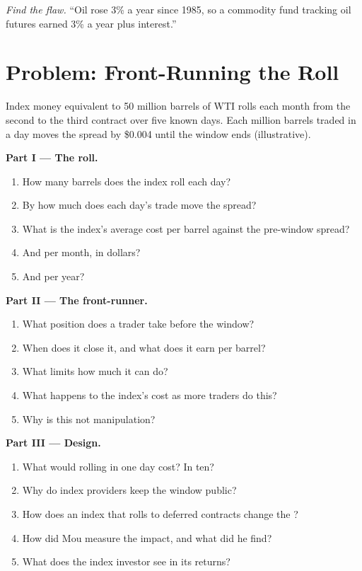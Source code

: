 \begin{exercise}[$\star\star\star$]\label{exo:m3:forward-curves-storage-and-convenience-yield:8}
\emph{Find the flaw.} ``Oil rose 3\% a year since 1985, so a commodity fund tracking oil futures earned
3\% a year plus interest.''
\end{exercise}

\section{Problem: Front-Running the Roll}

\begin{problem}\label{pb:m3:forward-curves-storage-and-convenience-yield:1}
Index money equivalent to 50 million barrels of WTI rolls each month from the second to the third
contract over five known days. Each million barrels traded in a day moves the spread by \$0.004 until
the window ends (illustrative).

\medskip\noindent\textbf{Part I --- The roll.}
\begin{enumerate}
\item How many barrels does the index roll each day?
\item By how much does each day's trade move the spread?
\item What is the index's average cost per barrel against the pre-window spread?
\item And per month, in dollars?
\item And per year?
\end{enumerate}

\medskip\noindent\textbf{Part II --- The front-runner.}
\begin{enumerate}[resume]
\item What position does a trader take before the window?
\item When does it close it, and what does it earn per barrel?
\item What limits how much it can do?
\item What happens to the index's cost as more traders do this?
\item Why is this not manipulation?
\end{enumerate}

\medskip\noindent\textbf{Part III --- Design.}
\begin{enumerate}[resume]
\item What would rolling in one day cost? In ten?
\item Why do index providers keep the window public?
\item How does an index that rolls to deferred contracts change the ?
\item How did Mou measure the impact, and what did he find?
\item What does the index investor see in its returns?
\end{enumerate}


\end{problem}

